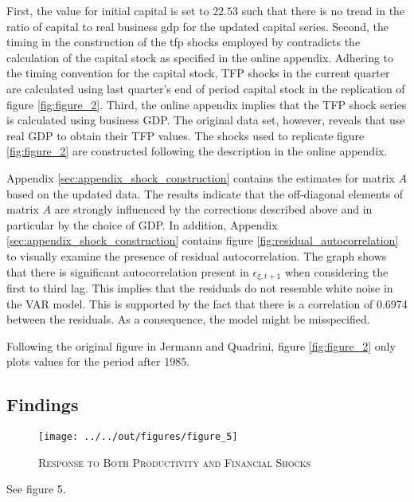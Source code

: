 First, the value for initial capital is set to $22.53$ such that there is no trend in the ratio of capital to real business gdp for the updated capital series. Second, the timing in the construction of the tfp shocks employed by \citeauthor{JERMANNfinancial} contradicts the calculation of the capital stock as specified in the online appendix. Adhering to the timing convention for the capital stock, TFP shocks in the current quarter are calculated using last quarter's end of period capital stock in the replication of figure \ref{fig:figure_2}. 
Third, the online appendix implies that the TFP shock series is calculated using business GDP. The original data set, however, reveals that \citeauthor{JERMANNfinancial} use real GDP to obtain their TFP values. The shocks used to replicate figure \ref{fig:figure_2} are constructed following the description in the online appendix. 

Appendix \ref{sec:appendix_shock_construction} contains the estimates for matrix $A$ based on the updated data. The results indicate that the off-diagonal elements of matrix $A$ are strongly influenced by the corrections described above and in particular by the choice of GDP. 
In addition, Appendix \ref{sec:appendix_shock_construction} contains figure \ref{fig:residual_autocorrelation} to visually examine the presence of residual autocorrelation.
The graph shows that there is significant autocorrelation present in ${\epsilon}_{\xi,t+1}$ when considering the first to third lag. This implies that the residuals do not resemble white noise in the VAR model. This is supported by the fact that there is a correlation of 0.6974 between the residuals. As a consequence, the model might be misspecified.

Following the original figure in Jermann and Quadrini, figure \ref{fig:figure_2} only plots values for the period after 1985.


\subsection{Findings}
\label{sec:findings}

\begin{figure}[t]
    
    \centering

    \texttt{[image: ../../out/figures/figure\_5]}

    \caption{\textsc{Response to Both Productivity and Financial Shocks}}
    
    \label{fig:figure_5}

\end{figure}

See figure 5.